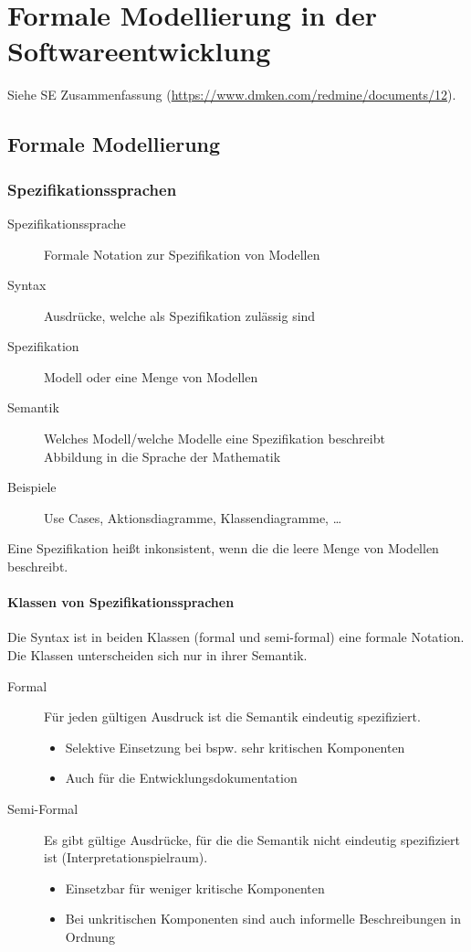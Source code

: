 \documentclass[a4paper, 11pt, accentcolor = tud3b]{tudreport}
\begin{document}
    \chapter{Formale Modellierung in der Softwareentwicklung}
	    Siehe SE Zusammenfassung (\url{https://www.dmken.com/redmine/documents/12}).
	    
	    \section{Formale Modellierung}
		    \subsection{Spezifikationssprachen}
			    \begin{description}
			    	\item[Spezifikationssprache] Formale Notation zur Spezifikation von Modellen
			    	\item[Syntax] Ausdrücke, welche als Spezifikation zulässig sind
			    	\item[Spezifikation] Modell oder eine Menge von Modellen
			    	\item[Semantik] Welches Modell/welche Modelle eine Spezifikation beschreibt \\ Abbildung in die Sprache der Mathematik
			    	\item[Beispiele] Use Cases, Aktionsdiagramme, Klassendiagramme, \dots
			    \end{description}
			    
			    Eine Spezifikation heißt inkonsistent, wenn die die leere Menge von Modellen beschreibt.
			    
			    \subsubsection{Klassen von Spezifikationssprachen}
				    Die Syntax ist in beiden Klassen (formal und semi-formal) eine formale Notation. Die Klassen unterscheiden sich nur in ihrer Semantik.
				    \begin{description}
				    	\item[Formal] Für jeden gültigen Ausdruck ist die Semantik eindeutig spezifiziert.
					    	\begin{itemize}
					    		\item Selektive Einsetzung bei bspw. sehr kritischen Komponenten
					    		\item Auch für die Entwicklungsdokumentation
					    	\end{itemize}
				    	\item[Semi-Formal] Es gibt gültige Ausdrücke, für die die Semantik nicht eindeutig spezifiziert ist (Interpretationspielraum).
					    	\begin{itemize}
					    		\item Einsetzbar für weniger kritische Komponenten
					    		\item Bei unkritischen Komponenten sind auch informelle Beschreibungen in Ordnung
					    	\end{itemize}
				    \end{description}
		    
\end{document}

